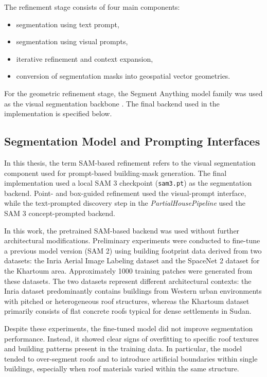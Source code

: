 The refinement stage consists of four main components:

\begin{itemize}
\item segmentation using text prompt,
\item segmentation using visual prompts,
\item iterative refinement and context expansion,
\item conversion of segmentation masks into geospatial vector geometries.
\end{itemize}

For the geometric refinement stage, the Segment Anything model family was used as the visual segmentation backbone \citep{kirillov2023segment, papersam3}. The final backend used in the implementation is specified below.

\subsection{Segmentation Model and Prompting Interfaces}

In this thesis, the term SAM-based refinement refers to the visual segmentation component used for prompt-based building-mask generation. The final implementation used a local SAM 3 checkpoint (\texttt{sam3.pt}) as the segmentation backend. Point- and box-guided refinement used the visual-prompt interface, while the text-prompted discovery step in the \textit{PartialHousePipeline} used the SAM 3 concept-prompted backend. 

In this work, the pretrained SAM-based backend was used without further architectural modifications. Preliminary experiments were conducted to fine-tune a previous model version (SAM 2) using building footprint data derived from two datasets: the Inria Aerial Image Labeling dataset and the SpaceNet 2 dataset for the Khartoum area. Approximately 1000 training patches were generated from these datasets. The two datasets represent different architectural contexts: the Inria dataset predominantly contains buildings from Western urban environments with pitched or heterogeneous roof structures, whereas the Khartoum dataset primarily consists of flat concrete roofs typical for dense settlements in Sudan.

Despite these experiments, the fine-tuned model did not improve segmentation performance. Instead, it showed clear signs of overfitting to specific roof textures and building patterns present in the training data. In particular, the model tended to over-segment roofs and to introduce artificial boundaries within single buildings, especially when roof materials varied within the same structure.

